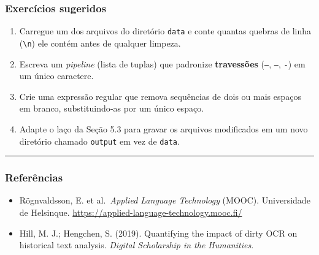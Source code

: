 \documentclass[
  brazilian,
  11pt,
]{article}
\providecommand{\tightlist}{%
  \setlength{\itemsep}{0pt}\setlength{\parskip}{0pt}}
\let\oldtexttt\texttt
\renewcommand{\texttt}[1]{{\color{inlink}\oldtexttt{#1}}}
\begin{document}
\subsubsection{Exercícios sugeridos}\label{exercuxedcios-sugeridos}

\begin{enumerate}
\def\labelenumi{\arabic{enumi}.}
\tightlist
\item
  Carregue um dos arquivos do diretório \texttt{data} e conte quantas
  quebras de linha (\texttt{\textbackslash{}n}) ele contém antes de
  qualquer limpeza.
\item
  Escreva um \emph{pipeline} (lista de tuplas) que padronize
  \textbf{travessões} (\texttt{—}, \texttt{–}, \texttt{-}) em um único
  caractere.
\item
  Crie uma expressão regular que remova sequências de dois ou mais
  espaços em branco, substituindo‑as por um único espaço.
\item
  Adapte o laço da Seção 5.3 para gravar os arquivos modificados em um
  novo diretório chamado \texttt{output} em vez de \texttt{data}.
\end{enumerate}

\begin{center}\rule{0.5\linewidth}{0.5pt}\end{center}

\subsubsection{Referências}\label{referuxeancias}

\begin{itemize}
\tightlist
\item
  Rögnvaldsson, E. et al.~\emph{Applied Language Technology} (MOOC).
  Universidade de Helsinque.
  \url{https://applied-language-technology.mooc.fi/}
\item
  Hill, M. J.; Hengchen, S. (2019). Quantifying the impact of dirty OCR
  on historical text analysis. \emph{Digital Scholarship in the
  Humanities}.
\end{itemize}
\end{document}
